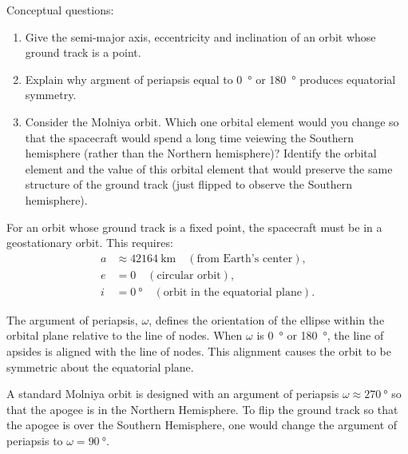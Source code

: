 \begin{hwkProblem}{1}{}

	Conceptual questions:
	\begin{enumerate}
		\item Give the semi-major axis, eccentricity and inclination of an orbit whose ground track is a point.
		\item Explain why argment of periapsis equal to \qty{0}{\degree} or \qty{180}{\degree} produces equatorial symmetry.
		\item Consider the Molniya orbit. Which one orbital element would you change so that the spacecraft would spend a long time veiewing the Southern hemisphere (rather than the Northern hemisphere)? Identify the orbital element and the value of this orbital element that would preserve the same structure of the ground track (just flipped to observe the Southern hemisphere).
	\end{enumerate}

	\hwkSol

	\hwkPart

	For an orbit whose ground track is a fixed point, the spacecraft must be in a geostationary orbit. This requires:
	\begin{align*}
		a &\approx \qty{42164}{\km} \quad (\text{from Earth’s center}), \\
		e &= 0 \quad (\text{circular orbit}), \\
		i &= \qty{0}{\degree} \quad (\text{orbit in the equatorial plane}).
	\end{align*}

	\hwkPart

	The argument of periapsis, \( \omega \), defines the orientation of the ellipse within the orbital plane relative to the line of nodes. When \( \omega \) is \qty{0}{\degree} or \qty{180}{\degree}, the line of apsides is aligned with the line of nodes. This alignment causes the orbit to be symmetric about the equatorial plane.

	\hwkPart

	A standard Molniya orbit is designed with an argument of periapsis \( \omega \approx \qty{270}{\degree} \) so that the apogee is in the Northern Hemisphere. To flip the ground track so that the apogee is over the Southern Hemisphere, one would change the argument of periapsis to \( \omega = \qty{90}{\degree} \).

\end{hwkProblem}

